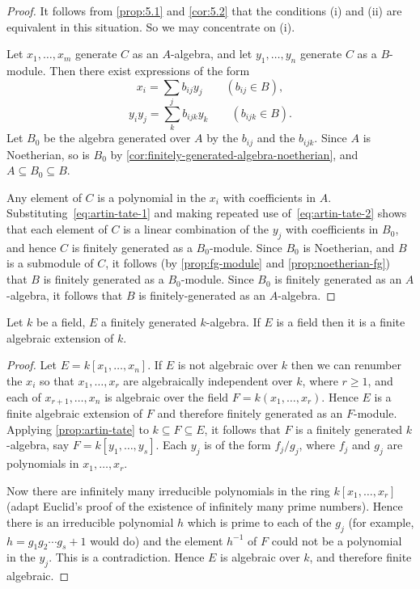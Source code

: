 \begin{proof}
It follows from \eqref{prop:5.1} and \eqref{cor:5.2} that the conditions (i) and (ii) are equivalent in this situation. So we may concentrate on (i).

Let $x_1, \ldots, x_m$ generate $C$ as an $A$-algebra, and let $y_1, \ldots, y_n$ generate $C$ as a $B$-module. Then there exist expressions of the form
\begin{equation}\label{eq:artin-tate-1}
x_i = \sum_j b_{ij} y_j \qquad (b_{ij} \in B), \tag{1}
\end{equation}
\begin{equation}\label{eq:artin-tate-2}
y_i y_j = \sum_k b_{ijk} y_k \qquad (b_{ijk} \in B). \tag{2}
\end{equation}
Let $B_0$ be the algebra generated over $A$ by the $b_{ij}$ and the $b_{ijk}$. Since $A$ is Noetherian, so is $B_0$ by \eqref{cor:finitely-generated-algebra-noetherian}, and $A \subseteq B_0 \subseteq B$.

Any element of $C$ is a polynomial in the $x_i$ with coefficients in $A$. Substituting~\eqref{eq:artin-tate-1} and making repeated use of~\eqref{eq:artin-tate-2} shows that each element of $C$ is a linear combination of the $y_j$ with coefficients in $B_0$, and hence $C$ is finitely generated as a $B_0$-module. Since $B_0$ is Noetherian, and $B$ is a submodule of $C$, it follows (by \eqref{prop:fg-module} and \eqref{prop:noetherian-fg}) that $B$ is finitely generated as a $B_0$-module. Since $B_0$ is finitely generated as an $A$-algebra, it follows that $B$ is finitely-generated as an $A$-algebra.
\end{proof}

\begin{proposition}\label{prop:nullstellensatz-weak}
Let $k$ be a field, $E$ a finitely generated $k$-algebra. If $E$ is a field then it is a finite algebraic extension of $k$.
\end{proposition}

\begin{proof}
Let $E = k[x_1, \ldots, x_n]$. If $E$ is not algebraic over $k$ then we can renumber the $x_i$ so that $x_1, \ldots, x_r$ are algebraically independent over $k$, where $r \geq 1$, and each of $x_{r+1}, \ldots, x_n$ is algebraic over the field $F = k(x_1, \ldots, x_r)$. Hence $E$ is a finite algebraic extension of $F$ and therefore finitely generated as an $F$-module. Applying \eqref{prop:artin-tate} to $k \subseteq F \subseteq E$, it follows that $F$ is a finitely generated $k$-algebra, say $F = k[y_1, \ldots, y_s]$. Each $y_j$ is of the form $f_j/g_j$, where $f_j$ and $g_j$ are polynomials in $x_1, \ldots, x_r$.

Now there are infinitely many irreducible polynomials in the ring $k[x_1, \ldots, x_r]$ (adapt Euclid's proof of the existence of infinitely many prime numbers). Hence there is an irreducible polynomial $h$ which is prime to each of the $g_j$ (for example, $h = g_1 g_2 \cdots g_s + 1$ would do) and the element $h^{-1}$ of $F$ could not be a polynomial in the $y_j$. This is a contradiction. Hence $E$ is algebraic over $k$, and therefore finite algebraic.
\end{proof}

